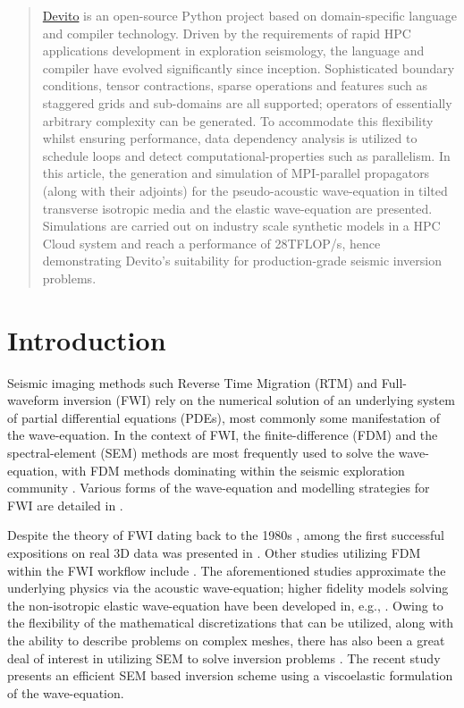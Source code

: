 \documentclass[10pt, conference]{IEEEtran}
\newcommand{\devito}{\href{https://github.com/devitocodes/devito}{Devito} }
\begin{document}
\begin{abstract}\label{abstract}

\devito is an open-source
Python project based on domain-specific language and compiler
technology. Driven by the requirements of rapid HPC applications
development in exploration seismology, the language and compiler have
evolved significantly since inception. Sophisticated boundary
conditions, tensor contractions, sparse operations and features such as
staggered grids and sub-domains are all supported; operators of
essentially arbitrary complexity can be generated. To accommodate this
flexibility whilst ensuring performance, data dependency analysis is
utilized to schedule loops and detect computational-properties such as
parallelism. In this article, the generation and simulation of
MPI-parallel propagators (along with their adjoints) for the
pseudo-acoustic wave-equation in tilted transverse isotropic media and
the elastic wave-equation are presented. Simulations are carried out on
industry scale synthetic models in a HPC Cloud system and reach a
performance of 28TFLOP/s, hence demonstrating Devito's suitability for
production-grade seismic inversion problems.
\end{abstract}

\section{Introduction}\label{introduction}

Seismic imaging methods such Reverse Time Migration (RTM) and
Full-waveform inversion (FWI) rely on the numerical solution of an
underlying system of partial differential equations (PDEs), most
commonly some manifestation of the wave-equation. In the context of FWI,
the finite-difference (FDM) and the spectral-element (SEM) methods are
most frequently used to solve the wave-equation, with FDM methods
dominating within the seismic exploration community \cite{lyu2020}.
Various forms of the wave-equation and modelling strategies for FWI are
detailed in \cite{fichtner2011}.

Despite the theory of FWI dating back to the 1980s
\cite{tarantola}, among the first successful
expositions on real 3D data was presented in \cite{sirgue}. Other
studies utilizing FDM within the FWI workflow include
\cite{ratcliffe2011, petersson2013}. The aforementioned studies
approximate the underlying physics via the acoustic wave-equation;
higher fidelity models solving the non-isotropic elastic wave-equation
have been developed in, e.g.,
\cite{osti_1468379, osti_1561580, osti_1561581, sava1, sava2}. Owing to
the flexibility of the mathematical discretizations that can be
utilized, along with the ability to describe problems on complex meshes,
there has also been a great deal of interest in utilizing SEM to solve
inversion problems \cite{peter2011, krebsdg}. The recent study
\cite{trinh2019} presents an efficient SEM based inversion scheme using
a viscoelastic formulation of the wave-equation.
\end{document}
